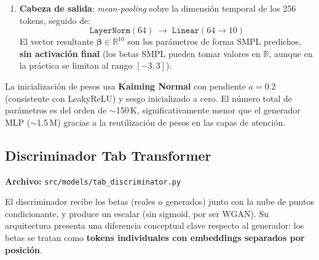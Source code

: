 \documentclass[a4paper,11pt]{article}
\begin{document}
\begin{enumerate}
          Cada capa aplica \emph{self-attention} sobre los 256 tokens,
          permitiendo que cada punto ``vea'' la geometría global del
          cuerpo a través de las puntuaciones de atención.

    \item \textbf{Cabeza de salida}: \emph{mean-pooling} sobre la dimensión
          temporal de los 256 tokens, seguido de:
          \[
            \texttt{LayerNorm}(64) \;\to\; \texttt{Linear}(64 \to 10)
          \]
          El vector resultante $\bm{\beta} \in \mathbb{R}^{10}$ son los
          parámetros de forma SMPL predichos, \textbf{sin activación final}
          (los betas SMPL pueden tomar valores en $\mathbb{R}$, aunque en
          la práctica se limitan al rango $[-3, 3]$).
\end{enumerate}

La inicialización de pesos usa \textbf{Kaiming Normal} con pendiente
$a=0.2$ (consistente con LeakyReLU) y sesgo inicializado a cero. El número
total de parámetros es del orden de $\sim$150\,K, significativamente menor
que el generador MLP ($\sim$1.5\,M) gracias a la reutilización de pesos
en las capas de atención.

\subsection{Discriminador Tab Transformer}

\textbf{Archivo:} \texttt{src/models/tab\_discriminator.py}

El discriminador recibe los betas (reales o generados) junto con la nube
de puntos condicionante, y produce un escalar (sin sigmoid, por ser WGAN).
Su arquitectura presenta una diferencia conceptual clave respecto al
generador: los betas se tratan como \textbf{tokens individuales con
embeddings separados por posición}.
\end{document}

